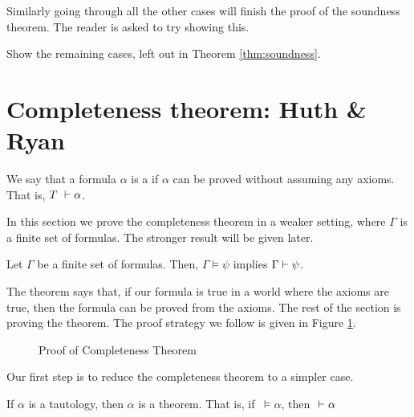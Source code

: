Similarly going through all the other cases will finish the proof of the soundness theorem. The reader is asked to try showing this.

\begin{exercise}
Show the remaining cases, left out in Theorem \ref{thm:soundness}.
\end{exercise}

\section[Completeness: Huth \& Ryan]{Completeness theorem: Huth \& Ryan}
\label{sec:completeness}

We say that a formula $\alpha$ is a  if $\alpha$ can be proved without assuming any axioms. That is, $T ~\vdash \alpha$. 

In this section we prove the completeness theorem in a weaker setting, where $\Gamma$ is a finite set of formulas. The stronger result will be given later.
\begin{theorem}[Completeness]
\label{thm:completeness}
Let $\Gamma$ be a finite set of formulas. Then,  $\Gamma \models \psi$ implies $\Gamma \vdash \psi$.
\end{theorem}
The theorem says that, if our formula is true in a world where the axioms are true, then the formula can be proved from the axioms. The rest of the section is proving the theorem. The proof strategy we follow is given in Figure \ref{fig:completenessHR}.

\begin{figure}[!h]
\centering
{}
\caption{Proof of Completeness Theorem}
\label{fig:completenessHR}
\end{figure}

Our first step is to reduce the completeness theorem to a simpler case. 
\begin{lemma}
\label{lem:complete}
If $\alpha$ is a tautology, then $\alpha$ is a theorem. That is, if \true $~\models \alpha$, then \true $~\vdash \alpha$
\end{lemma}

